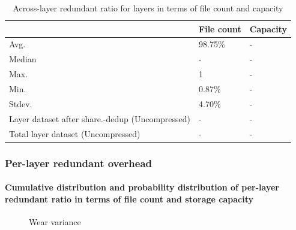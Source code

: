 \begin{table} 
	\centering 
	\scriptsize  
	\caption{Across-layer redundant ratio for layers in terms of file count and capacity} \label{tbl:across_ratio_layers} 
	\begin{tabular}{|l|l|l|}%
		\hline 
		& File count & Capacity \\
		\hline
		Avg. & 98.75\% & -\\
		\hline
		Median & - & - \\
		\hline
		Max. & 1 & -\\
		\hline
		Min.  & 0.87\%  & -\\
		\hline
		Stdev.  &  4.70\% & -\\
		\hline
		Layer dataset after share.-dedup (Uncompressed) & -  & -\\
		\hline 
		Total layer dataset (Uncompressed) &  -	& -\\
		\hline
	\end{tabular} 
\end{table}

\subsubsection{Per-layer redundant overhead}

\paragraph{Cumulative distribution and probability distribution of per-layer redundant ratio in terms of file count and storage capacity}

\begin{figure}
	\centering
	\caption{Wear variance}
	\label{fig:eval-stdev-erasure-cnt}
\end{figure}

